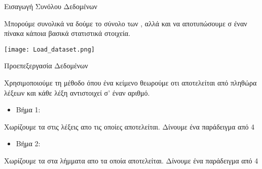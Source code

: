 \documentclass{beamer}
\begin{document}
\begin{frame}
\begin{flushleft}
{\color{blue}Εισαγωγή Συνόλου Δεδομένων} 
\end{flushleft}
\vfill
\item Μπορούμε συνολικά να δούμε το σύνολο των {}, αλλά και να αποτυπώσουμε σ έναν πίνακα κάποια βασικά στατιστικά στοιχεία.
\vfill
\begin{table}[!h]
\begin{center}
\texttt{[image: Load\_dataset.png]}
\end{center}

\end{table}
\end{frame}

\begin{frame}
\begin{flushleft}
{\color{blue}Προεπεξεργασία Δεδομένων} 
\end{flushleft}
\vfill
\item Χρησιμοποιούμε τη μέθοδο {} όπου ένα κείμενο θεωρούμε οτι αποτελείται από πληθώρα λέξεων και κάθε λέξη αντιστοιχεί σ' έναν αριθμό.
\vfill
\begin{itemize}
\item Βήμα 1: {}
\end{itemize}
\item Χωρίζουμε τα {} στις λέξεις απο τις οποίες αποτελείται. Δίνουμε ένα παράδειγμα από 4 {}
\vfill
\item {}
\item {}
\item {}
\item {}
\vfill
\end{frame}

\begin{frame}
\begin{itemize}
\item Βήμα 2: {}
\end{itemize}
\item Χωρίζουμε τα {} στα λήμματα απο τα οποία αποτελείται. Δίνουμε ένα παράδειγμα από 4 {}
\vfill
\item {}
\item {}
\item {}
\item {}
\vfill
\end{frame}
\end{document}
